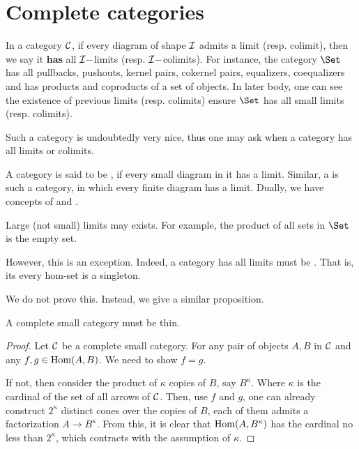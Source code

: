 \newpage\section{Complete categories}
  In a category ${\cal C}$, if every diagram of shape ${\cal I}$ admits a limit (resp. colimit), then we say it \textbf{has} all ${\cal I}-$limits (resp. ${\cal I}-$colimits). For instance, the category $\Set$ has all pullbacks, pushouts, kernel pairs, cokernel pairs, equalizers, coequalizers and has products and coproducts of a set of objects. In later body, one can see the existence of previous limits (resp. colimits) ensure $\Set$ has all small limits (resp. colimits).

  Such a category is undoubtedly very nice, thus one may ask when a category has all limits or colimits.

  \begin{defn}
    A category is said to be , if every small diagram in it has a limit. Similar, a  is such a category, in which every finite diagram has a limit.
    Dually, we have concepts of  and .
  \end{defn}

    Large (not small) limits may exists. For example, the product of all sets in $\Set$ is the empty set.

    However, this is an exception. Indeed, a category has all limits must be . That is, its every hom-set is a singleton.

  We do not prove this. Instead, we give a similar proposition.
  \begin{prop}\label{prop:complete small category = proset}
    A complete small category must be thin.
  \end{prop}
  \begin{proof}
    Let ${\cal C}$ be a complete small category. For any pair of objects $A,B$ in ${\cal C}$ and any $f,g\in\operatorname{Hom}(A,B)$. We need to show $f=g$.

    If not, then consider the product of $\kappa$ copies of $B$, say $B^{\kappa}$. Where $\kappa$ is the cardinal of the set of all arrows of ${\cal C}$. Then, use $f$ and $g$, one can already construct $2^{\kappa}$ distinct cones over the copies of $B$, each of them admits a factorization $A\to B^{\kappa}$. From this, it is clear that $\operatorname{Hom}(A,B^{\kappa})$ has the cardinal no less than $2^{\kappa}$, which contracts with the assumption of $\kappa$.
  \end{proof}

